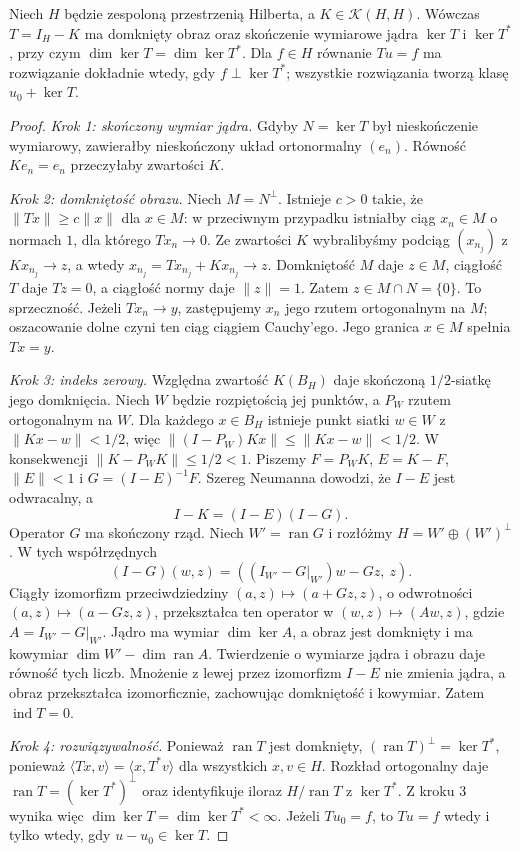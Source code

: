 \begin{twierdzenie}
\label{thm:fredholm-hilbert30}
Niech $H$ będzie zespoloną przestrzenią Hilberta, a
$K\in\mathcal K(H,H)$. Wówczas $T=I_H-K$ ma domknięty
obraz oraz skończenie wymiarowe jądra $\ker T$ i $\ker T^*$,
przy czym $\dim\ker T=\dim\ker T^*$.
Dla $f\in H$ równanie $Tu=f$ ma rozwiązanie dokładnie wtedy,
gdy $f\perp\ker T^*$; wszystkie rozwiązania tworzą
klasę $u_0+\ker T$.
\end{twierdzenie}
\begin{proof}
\emph{Krok 1: skończony wymiar jądra.}
Gdyby $N=\ker T$ był nieskończenie wymiarowy, zawierałby
nieskończony układ ortonormalny $(e_n)$. Równość $Ke_n=e_n$
przeczyłaby zwartości $K$.

\emph{Krok 2: domkniętość obrazu.}
Niech $M=N^\perp$. Istnieje $c>0$ takie, że
$\|Tx\|\ge c\|x\|$ dla $x\in M$: w przeciwnym przypadku
istniałby ciąg $x_n\in M$ o normach $1$, dla którego
$Tx_n\to0$. Ze zwartości $K$ wybralibyśmy podciąg
$(x_{n_j})$ z $Kx_{n_j}\to z$, a wtedy
$x_{n_j}=Tx_{n_j}+Kx_{n_j}\to z$. Domkniętość $M$ daje
$z\in M$, ciągłość $T$ daje $Tz=0$, a ciągłość normy
daje $\|z\|=1$. Zatem $z\in M\cap N=\{0\}$.
To sprzeczność. Jeżeli $Tx_n\to y$, zastępujemy $x_n$
jego rzutem ortogonalnym na $M$; oszacowanie dolne
czyni ten ciąg ciągiem Cauchy'ego. Jego granica $x\in M$
spełnia $Tx=y$.

\emph{Krok 3: indeks zerowy.}
Względna zwartość $K(B_H)$ daje skończoną $1/2$-siatkę
jego domknięcia. Niech $W$ będzie rozpiętością jej punktów,
a $P_W$ rzutem ortogonalnym na $W$. Dla każdego $x\in B_H$
istnieje punkt siatki $w\in W$ z $\|Kx-w\|<1/2$,
więc $\|(I-P_W)Kx\|\le\|Kx-w\|<1/2$.
W konsekwencji $\|K-P_WK\|\le1/2<1$.
Piszemy $F=P_WK$, $E=K-F$, $\|E\|<1$ i
$G=(I-E)^{-1}F$. Szereg Neumanna dowodzi, że $I-E$
jest odwracalny, a
\[I-K=(I-E)(I-G).\]
Operator $G$ ma skończony rząd. Niech $W'=\operatorname{ran}G$
i rozłóżmy $H=W'\oplus(W')^\perp$.
W tych współrzędnych
\[(I-G)(w,z)=((I_{W'}-G|_{W'})w-Gz,\ z).\]
Ciągły izomorfizm przeciwdziedziny $(a,z)\mapsto(a+Gz,z)$,
o odwrotności $(a,z)\mapsto(a-Gz,z)$, przekształca ten
operator w $(w,z)\mapsto(Aw,z)$, gdzie $A=I_{W'}-G|_{W'}$.
Jądro ma wymiar $\dim\ker A$, a obraz jest domknięty
i ma kowymiar $\dim W'-\dim\operatorname{ran}A$.
Twierdzenie o wymiarze jądra i obrazu daje równość tych
liczb. Mnożenie z lewej przez izomorfizm $I-E$ nie zmienia
jądra, a obraz przekształca izomorficznie, zachowując
domkniętość i kowymiar. Zatem $\operatorname{ind}T=0$.

\emph{Krok 4: rozwiązywalność.}
Ponieważ $\operatorname{ran}T$ jest domknięty,
$(\operatorname{ran}T)^\perp=\ker T^*$, ponieważ
$\langle Tx,v\rangle=\langle x,T^*v\rangle$ dla wszystkich
$x,v\in H$. Rozkład ortogonalny daje
$\operatorname{ran}T=(\ker T^*)^\perp$ oraz identyfikuje
iloraz $H/\operatorname{ran}T$ z $\ker T^*$.
Z kroku 3 wynika więc $\dim\ker T=\dim\ker T^*<\infty$.
Jeżeli $Tu_0=f$, to $Tu=f$ wtedy i tylko wtedy, gdy
$u-u_0\in\ker T$.
\end{proof}

